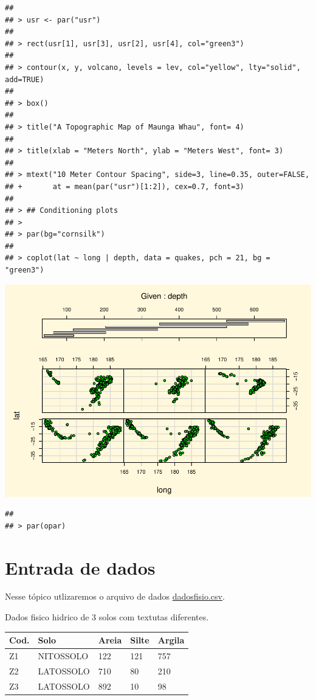 \documentclass[
]{book}
\begin{document}
\begin{verbatim}
## 
## > usr <- par("usr")
## 
## > rect(usr[1], usr[3], usr[2], usr[4], col="green3")
## 
## > contour(x, y, volcano, levels = lev, col="yellow", lty="solid", add=TRUE)
## 
## > box()
## 
## > title("A Topographic Map of Maunga Whau", font= 4)
## 
## > title(xlab = "Meters North", ylab = "Meters West", font= 3)
## 
## > mtext("10 Meter Contour Spacing", side=3, line=0.35, outer=FALSE,
## +       at = mean(par("usr")[1:2]), cex=0.7, font=3)
## 
## > ## Conditioning plots
## > 
## > par(bg="cornsilk")
## 
## > coplot(lat ~ long | depth, data = quakes, pch = 21, bg = "green3")
\end{verbatim}

\includegraphics{TudodoR_files/figure-latex/unnamed-chunk-147-11.pdf}

\begin{verbatim}
## 
## > par(opar)
\end{verbatim}

\hypertarget{entrada-de-dados-1}{%
\section{Entrada de dados}\label{entrada-de-dados-1}}

Nesse tópico utlizaremos o arquivo de dados \href{https://www.dropbox.com/s/zg7fyg1iewtji49/dadosfisio.csv?dl=1}{dadosfisio.csv}.

Dados fisico hidrico de 3 solos com textutas diferentes.

\begin{longtable}[]{@{}lllll@{}}
\toprule
Cod. & Solo & Areia & Silte & Argila\tabularnewline
\midrule
\endhead
Z1 & NITOSSOLO & 122 & 121 & 757\tabularnewline
Z2 & LATOSSOLO & 710 & 80 & 210\tabularnewline
Z3 & LATOSSOLO & 892 & 10 & 98\tabularnewline
\bottomrule
\end{longtable}
\end{document}
